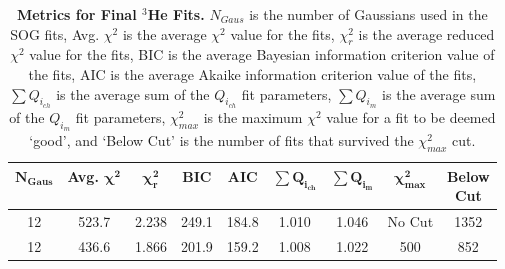 
\vspace{6mm}
\begin{table}[!h]
\centering
\begin{tabular}{|c c c c c c c c c|}
\hline
\textbf{$\boldsymbol{N_{Gaus}}$} & \textbf{Avg. $\boldsymbol{\chi^2}$} & \textbf{$\boldsymbol{\chi^2_r}$} & \textbf{BIC} & \textbf{AIC} & \textbf{$\boldsymbol{\sum Q_{i_{ch}}}$} & \textbf{$\boldsymbol{\sum Q_{i_{m}}}$} & \textbf{$\boldsymbol{\chi^2_{max}}$} & \makecell{\textbf{Below}\\ \textbf{Cut}} \\
\hline
12 & 523.7 & 2.238 & 249.1 & 184.8 & 1.010 & 1.046 & No Cut & 1352\\
12 & 436.6 & 1.866 & 201.9 & 159.2 & 1.008 & 1.022 & 500 & 852\\
\hline
\end{tabular}
\caption[Metrics for Final $^3$He Fits]{{\bf{Metrics for Final $^3$He Fits.}} $N_{Gaus}$ is the number of Gaussians used in the SOG fits, Avg. $\chi^2$ is the average $\chi^2$ value for the fits, $\chi^2_r$ is the average reduced $\chi^2$ value for the fits, BIC is the average Bayesian information criterion value of the fits, AIC is the average Akaike information criterion value of the fits, $\sum Q_{i_{ch}}$ is the average sum of the $Q_{i_{ch}}$ fit parameters, $\sum Q_{i_{m}}$ is the average sum of the $Q_{i_{m}}$ fit parameters, $\chi^2_{max}$ is the maximum $\chi^2$ value for a fit to be deemed `good', and `Below Cut' is the number of fits that survived the $\chi^2_{max}$ cut.}
\label{tab:3he_fits}
\end{table}

